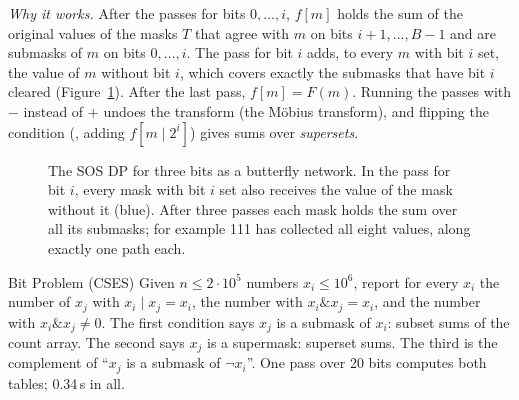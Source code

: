 \emph{Why it works.} After the passes for bits $0, \dots, i$, $f[m]$ holds the sum of the original values of the masks $T$ that agree
with $m$ on bits $i+1, \dots, B-1$ and are submasks of $m$ on bits $0, \dots, i$. The pass for bit $i$ adds, to every $m$ with bit
$i$ set, the value of $m$ without bit $i$, which covers exactly the submasks that have bit $i$ cleared
(Figure~\ref{fig:sos}). After the last pass, $f[m] = F(m)$. Running the passes with $-$ instead of $+$ undoes the transform (the
M\"obius transform), and flipping the condition (, adding $f[m \mid 2^i]$) gives sums over \emph{supersets}.

\begin{figure}[htbp]
\centering
{}
\caption{The SOS DP for three bits as a butterfly network. In the pass for bit $i$, every mask with bit $i$ set also receives the
value of the mask without it (blue). After three passes each mask holds the sum over all its submasks; for example 111 has
collected all eight values, along exactly one path each.}
\label{fig:sos}
\end{figure}

\begin{problem}{Bit Problem (CSES)}
Given $n \le 2 \cdot 10^5$ numbers $x_i \le 10^6$, report for every $x_i$ the number of $x_j$ with $x_i \mid x_j = x_i$, the number with
$x_i \mathbin{\&} x_j = x_i$, and the number with $x_i \mathbin{\&} x_j \ne 0$.
\solution The first condition says $x_j$ is a submask of $x_i$: subset sums of the count array. The second says $x_j$ is a
supermask: superset sums. The third is the complement of ``$x_j$ is a submask of $\lnot x_i$''. One pass over 20 bits computes both
tables; 0.34\,s in all.
\end{problem}

